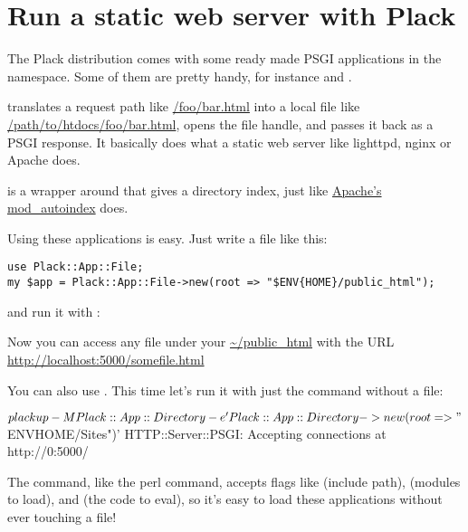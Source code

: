 \chapter{Run a static web server with
Plack}\label{day-5-run-a-static-web-server-with-plack}

The Plack distribution comes with some ready made PSGI applications in
the  namespace. Some of them are pretty handy, for instance
\href{http://search.cpan.org/perldoc?Plack::App::File}{}
and
\href{http://search.cpan.org/perldoc?Plack::App::Directory}{}.

 translates a request path like
\url{/foo/bar.html} into a local file like
\url{/path/to/htdocs/foo/bar.html}, opens the file handle, and
passes it back as a PSGI response. It basically does what a static web
server like lighttpd, nginx or Apache does.

 is a wrapper around  that gives a
directory index, just like
\href{http://httpd.apache.org/docs/2.0/mod/mod_autoindex.html}{Apache's
mod\_autoindex} does.

Using these applications is easy. Just write a  file like this:

\begin{lstlisting}
use Plack::App::File;
my $app = Plack::App::File->new(root => "$ENV{HOME}/public_html");
\end{lstlisting}
%
and run it with :


Now you can access any file under your \url{~/public_html} with
the URL \url{http://localhost:5000/somefile.html}

You can also use . This time let's run it with just
the  command without a  file:

\begin{shell}
$ plackup -MPlack::App::Directory -e 'Plack::App::Directory->new(root => "$ENV{HOME}/Sites")'
HTTP::Server::PSGI: Accepting connections at http://0:5000/
\end{shell}

The  command, like the perl command, accepts flags like
 (include path),  (modules to load), and
 (the code to eval), so it's easy to load these
 applications without ever touching a  file!

